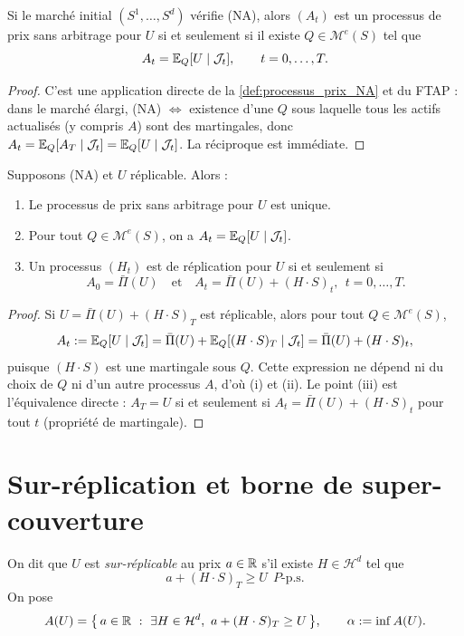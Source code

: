 \begin{lemme}\label{lem:prix_dynamique_EQ}
Si le marché initial $(S^1,\dots,S^d)$ vérifie (NA), alors $(A_t)$ est un processus de prix
sans arbitrage pour $U$ si et seulement si il existe $Q\in\mathcal{M}^e(S)$ tel que
\[
A_t=\mathbb{E}_Q[U\mid \mathcal{J}_t],\qquad t=0,\dots,T.
\]
\end{lemme}

\begin{proof}
C'est une application directe de la \ref{def:processus_prix_NA} et du FTAP :
dans le marché élargi, (NA) $\Leftrightarrow$ existence d'une $Q$ sous laquelle tous les actifs
actualisés (y compris $A$) sont des martingales, donc $A_t=\mathbb{E}_Q[A_T\mid\mathcal{J}_t]=\mathbb{E}_Q[U\mid\mathcal{J}_t]$.
La réciproque est immédiate.
\end{proof}

\begin{lemme}\label{lem:unicite_processus_si_replicable}
Supposons (NA) et $U$ réplicable. Alors :
\begin{enumerate}
\item[(i)] Le processus de prix sans arbitrage pour $U$ est unique.
\item[(ii)] Pour tout $Q\in\mathcal{M}^e(S)$, on a $A_t=\mathbb{E}_Q[U\mid\mathcal{J}_t]$.
\item[(iii)] Un processus $(H_t)$ est de réplication pour $U$ si et seulement si
\[
A_0=\bar\Pi(U)\quad\text{et}\quad A_t=\bar\Pi(U)+(H\cdot S)_t,\ \ t=0,\dots,T.
\]
\end{enumerate}
\end{lemme}

\begin{proof}
Si $U=\bar\Pi(U)+(H\cdot S)_T$ est réplicable, alors pour tout $Q\in\mathcal{M}^e(S)$,
\[
A_t:=\mathbb{E}_Q[U\mid\mathcal{J}_t]=\bar\Pi(U)+\mathbb{E}_Q[(H\cdot S)_T\mid\mathcal{J}_t]
=\bar\Pi(U)+(H\cdot S)_t,
\]
puisque $(H\cdot S)$ est une martingale sous $Q$. Cette expression ne dépend ni du choix
de $Q$ ni d'un autre processus $A$, d'où (i) et (ii). Le point (iii) est l'équivalence directe :
$A_T=U$ si et seulement si $A_t=\bar\Pi(U)+(H\cdot S)_t$ pour tout $t$ (propriété de martingale).
\end{proof}

\section{Sur-réplication et borne de super-couverture}

\begin{definition}
On dit que $U$ est \emph{sur-réplicable} au prix $a\in\mathbb{R}$ s'il existe $H\in\mathcal{H}^d$ tel que
\[
a + (H\cdot S)_T \ge U\ \ \text{$P$-p.s.}
\]
On pose
\begin{equation}
A(U)=\big\{\, a\in\mathbb{R}\ :\ \exists H\in\mathcal{H}^d,\ a+(H\cdot S)_T\ge U \,\big\},
\qquad
\alpha := \inf A(U).
\end{equation}
\end{definition}

